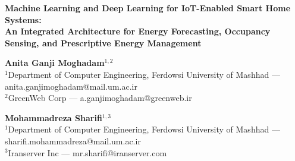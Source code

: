 \documentclass[11pt,a4paper]{article}
\begin{document}
\begin{center}
{\bfseries\fontsize{16}{19}\selectfont Machine Learning and Deep Learning for IoT-Enabled Smart Home Systems:\\[2pt]
An Integrated Architecture for Energy Forecasting, Occupancy Sensing, and Prescriptive Energy Management}

\vspace{1em}
{\bfseries\fontsize{12}{14}\selectfont Anita Ganji Moghadam$^{1,2}$}\\
\fontsize{11}{13}\selectfont
$^{1}$Department of Computer Engineering, Ferdowsi University of Mashhad --- anita.ganjimoghadam@mail.um.ac.ir\\
$^{2}$GreenWeb Corp --- a.ganjimoghadam@greenweb.ir

\vspace{0.6em}
{\bfseries\fontsize{12}{14}\selectfont Mohammadreza Sharifi$^{1,3}$}\\
\fontsize{11}{13}\selectfont
$^{1}$Department of Computer Engineering, Ferdowsi University of Mashhad --- sharifi.mohammadreza@mail.um.ac.ir\\
$^{3}$Iranserver Inc --- mr.sharifi@iranserver.com
\end{center}

\vspace{0.6em}
\end{document}
